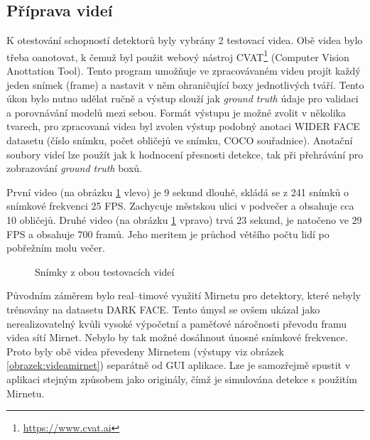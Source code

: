 \subsection*{Příprava videí}
K otestování schopností detektorů byly vybrány 2 testovací videa. Obě videa bylo třeba oanotovat, k čemuž byl použit webový nástroj CVAT\footnote{\url{https://www.cvat.ai}} (Computer Vision Anottation Tool). 
Tento program umožňuje ve zpracovávaném videu projít každý jeden snímek (frame) a nastavit v něm ohraničující boxy jednotlivých tváří. Tento úkon bylo nutno udělat ručně a výstup slouží jak \emph{ground truth} údaje pro validaci a porovnávání modelů mezi sebou. Formát výstupu je možné zvolit v několika tvarech, pro zpracovaná videa byl zvolen výstup podobný anotaci WIDER FACE datasetu (číslo snímku, počet obličejů ve snímku, COCO souřadnice). Anotační soubory videí lze použít jak k hodnocení přesnosti detekce, tak při přehrávání pro zobrazování \emph{ground truth} boxů. 

První video (na obrázku \ref{obrazek:videa} vlevo) je 9 sekund dlouhé, skládá se z 241 snímků o snímkové frekvenci 25 FPS. Zachycuje městskou ulici v podvečer a obsahuje cca 10 obličejů. Druhé video (na obrázku \ref{obrazek:videa} vpravo) trvá 23 sekund, je natočeno ve 29 FPS a obsahuje 700 framů. Jeho meritem je průchod většího počtu lidí po pobřežním molu večer.

\begin{figure}[H] 
  \begin{center}
  \label{obrazek:videa}
  \caption{Snímky z obou testovacích videí}
  \end{center}
\end{figure}

Původním záměrem bylo real--timové využití Mirnetu pro detektory, které nebyly trénovány na datasetu DARK FACE. Tento úmysl se ovšem ukázal jako nerealizovatelný kvůli vysoké výpočetní a paměťové náročnosti převodu framu videa sítí Mirnet. Nebylo by tak možné dosáhnout únosné snímkové frekvence. Proto byly obě videa převedeny Mirnetem (výstupy viz obrázek \ref{obrazek:videamirnet}) separátně od GUI aplikace. Lze je samozřejmě spustit v aplikaci stejným způsobem jako originály, čímž je simulována detekce s použitím Mirnetu.

